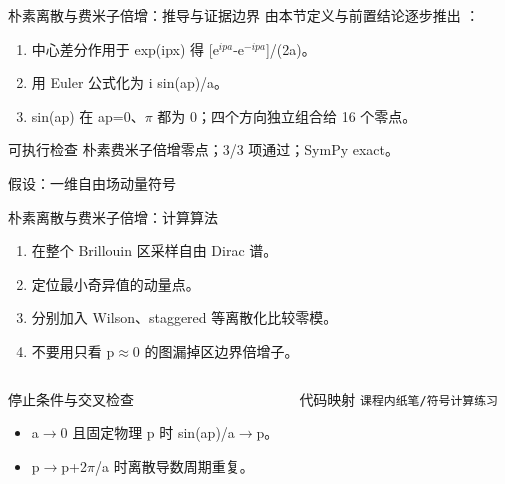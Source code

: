\begin{frame}[t]{朴素离散与费米子倍增：推导与证据边界}
\footnotesize
{}\quad 由本节定义与前置结论逐步推出 ：
\begin{enumerate}
\item 中心差分作用于 exp(ipx) 得 [e\ensuremath{^{ipa}}-e\ensuremath{^{-ipa}}]/\allowbreak{}(2a)。
\item 用 Euler 公式化为 i sin(ap)/\allowbreak{}a。
\item sin(ap) 在 ap=0、\ensuremath{\pi} 都为 0；四个方向独立组合给 16 个零点。
\end{enumerate}\begin{block}{可执行检查}
\quad 朴素费米子倍增零点；3/3 项通过；SymPy exact。
\par\scriptsize 假设：一维自由场动量符号
\end{block}
\end{frame}

\begin{frame}[t]{朴素离散与费米子倍增：计算算法}
\footnotesize
{}\begin{enumerate}
\item 在整个 Brillouin 区采样自由 Dirac 谱。
\item 定位最小奇异值的动量点。
\item 分别加入 Wilson、staggered 等离散化比较零模。
\item 不要用只看 p\ensuremath{\approx}0 的图漏掉区边界倍增子。
\end{enumerate}\begin{columns}[T,onlytextwidth]
\begin{block}{停止条件与交叉检查}\scriptsize\begin{itemize}
\item[\CheckMark] a\ensuremath{\rightarrow}0 且固定物理 p 时 sin(ap)/\allowbreak{}a\ensuremath{\rightarrow}p。
\item[\CheckMark] p\ensuremath{\rightarrow}p+2\ensuremath{\pi}/\allowbreak{}a 时离散导数周期重复。
\end{itemize}\end{block}
\begin{block}{代码映射}
\scriptsize \texttt{课程内纸笔/\allowbreak{}符号计算练习}
\end{block}\end{columns}\end{frame}

